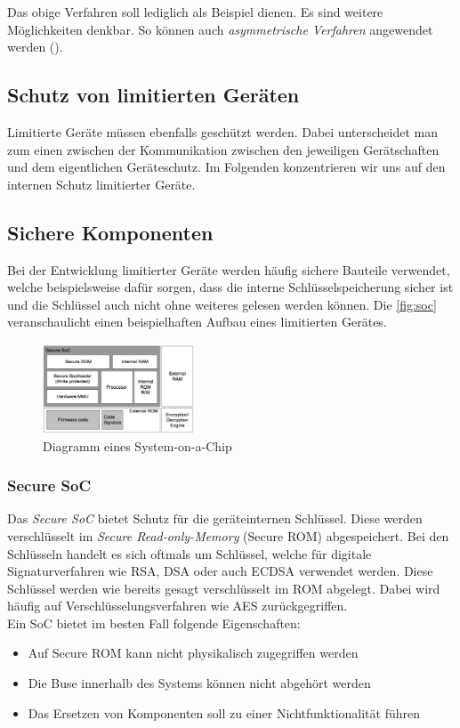 \documentclass[conference]{IEEEtran}
\begin{document}
Das obige Verfahren soll lediglich als Beispiel dienen. Es sind weitere Möglichkeiten denkbar. So können auch \textit{asymmetrische Verfahren} angewendet werden (\cite{pubenc}).

\subsection{Schutz von limitierten Geräten}

Limitierte Geräte müssen ebenfalls geschützt werden. Dabei unterscheidet man zum einen zwischen der Kommunikation zwischen den jeweiligen Gerätschaften und dem eigentlichen Geräteschutz. Im Folgenden konzentrieren wir uns auf den internen Schutz limitierter Geräte.

\subsection{Sichere Komponenten}

Bei der Entwicklung limitierter Geräte werden häufig sichere Bauteile verwendet, welche beispielsweise dafür sorgen, dass die interne Schlüsselspeicherung sicher ist und die Schlüssel auch nicht ohne weiteres gelesen werden können.
Die \autoref{fig:soc} veranschaulicht einen beispielhaften Aufbau eines limitierten Gerätes.

\begin{figure}[h]
\centering
  \includegraphics[width=0.4\textwidth]{soc}
  \caption{Diagramm eines System-on-a-Chip}
  \label{fig:soc}
\end{figure}

\subsubsection{Secure SoC} Das \textit{Secure SoC} bietet Schutz für die geräteinternen Schlüssel. Diese werden verschlüsselt im \textit{Secure Read-only-Memory} (Secure ROM) abgespeichert. Bei den Schlüsseln handelt es sich oftmals um Schlüssel, welche für digitale Signaturverfahren wie RSA, DSA oder auch ECDSA verwendet werden. Diese Schlüssel werden wie bereits gesagt verschlüsselt im ROM abgelegt. Dabei wird häufig auf Verschlüsselungsverfahren wie AES zurückgegriffen.\cite{anoopms}\\
Ein SoC bietet im besten Fall folgende Eigenschaften: 
\begin{itemize}
  \item Auf Secure ROM kann nicht physikalisch zugegriffen werden 
  \item Die Buse innerhalb des Systems können nicht abgehört werden
  \item Das Ersetzen von Komponenten soll zu einer Nichtfunktionalität führen 
\end{itemize} 
\end{document}

